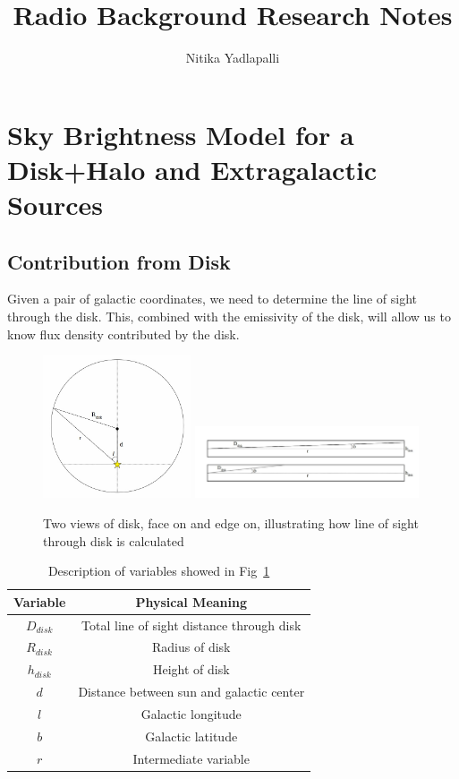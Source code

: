 \documentclass[letterpaper, 10pt]{article}
\title{Radio Background Research Notes}
\author{Nitika Yadlapalli}
\date{}
\begin{document}
\maketitle

\section{Sky Brightness Model for a Disk+Halo and Extragalactic Sources}

\subsection{Contribution from Disk}
Given a pair of galactic coordinates, we need to determine the line of sight through the disk. This, combined with the emissivity of the disk, will allow us to know flux density contributed by the disk.

\begin{figure}[h]
\begin{center}
\includegraphics[width=0.39\textwidth]{disk_face.jpg}
\includegraphics[width=0.59\textwidth]{disk_edge.jpg}
\caption{Two views of disk, face on and edge on, illustrating how line of sight through disk is calculated}
\label{disk}
\end{center}
\end{figure}

\begin{table}[h]
\centering
\begin{tabular}{| c | c |}
\hline
\textbf{Variable} & \textbf{Physical Meaning} \\
\hline
$D_{disk}$ & Total line of sight distance through disk \\
\hline
$R_{disk}$ & Radius of disk \\
\hline
$h_{disk}$ & Height of disk \\
\hline
$d$ & Distance between sun and galactic center \\
\hline
$l$ & Galactic longitude \\
\hline
$b$ & Galactic latitude \\
\hline
$r$ & Intermediate variable \\
\hline
\end{tabular}
\caption{Description of variables showed in Fig~\ref{disk}}
\end{table}
\end{document}
